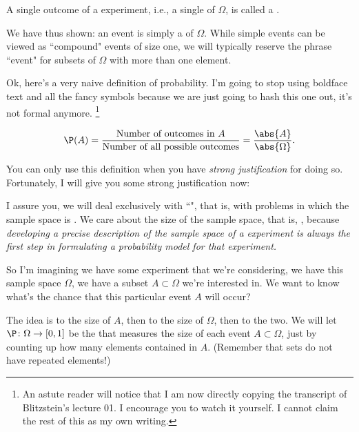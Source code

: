 \documentclass{ccg-topic}
\begin{document}
\begin{defn}
    \label{defn:simple_event}
    A single outcome of a experiment, i.e., a single  of $\Omega$, is called a . 
\end{defn}

\begin{note}[]
    \label{rem:subset}
    We have thus shown: an event is simply a  of $\Omega$. While simple events can be viewed as ``compound" events of size one, we will typically reserve the phrase ``event" for subsets of $\Omega$ with more than one element. 
\end{note}

Ok, here's a very naive definition of probability. I'm going to stop using boldface text and all the fancy symbols because we are just going to hash this one out, it's not formal anymore.%
    \footnote{%
    An astute reader will notice that I am now directly copying the transcript of Blitzstein's lecture 01. I encourage you to watch it yourself. I cannot claim the rest of this as my own writing.
    }


$$\P(A)=\frac{\textnormal{Number of outcomes in } A}{\textnormal{Number of all possible outcomes}} = \frac{\abs{A}}{\abs{\Omega}}.$$

You can only use this definition when you have \emph{strong justification} for doing so. Fortunately, I will give you some strong justification now:
\begin{note}
    \label{rem:first_steps_towards_modelling_an_expirement}
I assure you, we will deal exclusively with ``", that is, with problems in which the sample space is .
    We care about the size of the sample space, that is, , because \emph{developing a precise description of the sample space of a experiment is always the first step in formulating a probability model for that experiment.}
\end{note}

So I'm imagining we have some experiment that we're considering, we have this sample space $\Omega$, we have a subset $A \subset \Omega$ we're interested in. We want to know what's the chance that this particular event $A$ will occur?

\begin{note}[Measure it!]
    \label{rem:measure_it_}
    The idea is to  the size of $A$, then to  the size of $\Omega$, then to  the two. We will let $\P \colon \Omega \to [0,1]$ be the  that measures the size of each event $A \subset \Omega$, just by counting up how many elements contained in $A$. (Remember that sets do not have repeated elements!)
\end{note}
\end{document}
